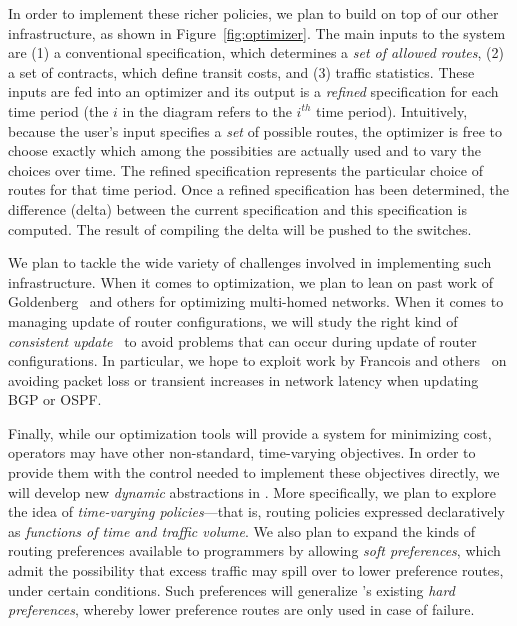 In order to implement these richer policies, we plan to build on top of our other infrastructure,
as shown in Figure~\ref{fig:optimizer}.  The main inputs to the system are (1) a conventional
\Name specification, which determines a \emph{set of allowed routes}, (2) a set of contracts, which
define transit costs, and (3) traffic statistics.  These inputs are fed into an optimizer and
its output is a \emph{refined} \Name specification
for each time period (the $i$ in the diagram refers to the $i^{th}$ time period).
Intuitively, because the user's input specifies a \emph{set} of possible routes, the optimizer is
free to choose exactly which among the possibities are actually used and to vary the choices over time.  
The refined specification represents the particular choice of routes for that time period.  
Once a refined specification has been determined, the difference (delta) between the current
specification and this specification is computed.  The result of compiling the delta will be
pushed to the switches.

We plan to tackle the wide variety of challenges involved in implementing such infrastructure.
When it comes to optimization, we plan to lean on past work 
of Goldenberg~\cite{Goldenberg:multi-home} and others for optimizing multi-homed networks.
When it comes to managing update of router configurations, we will study the right kind
of \emph{consistent update}~\cite{reitblatt+:consistent-updates,Katta:incremental-consistent,Jin:dynamic-updates,McClurg:update-synthesis,McClurg:event-driven-network-programming} to avoid problems that can
occur during update of router configurations.  In particular, we hope to exploit work by 
Francois and others~\cite{FCDB07,CMPFB13} on avoiding packet loss or transient increases 
in network latency when updating BGP or OSPF.  

Finally, while our optimization tools will provide a system for minimizing cost, operators may have 
other non-standard, time-varying objectives.  In order to provide them with the control needed to 
implement these objectives directly, we will develop new \emph{dynamic} abstractions in \Name.  
More specifically, we plan to explore the idea of \emph{time-varying policies}---that is, 
routing policies expressed declaratively as \emph{functions of time and traffic volume}.  We 
also plan to expand the kinds of routing preferences available to programmers 
by allowing \emph{soft preferences},
which admit the possibility that excess traffic may spill over to lower preference routes,
under certain conditions.  Such preferences will generalize \Propane's existing \emph{hard preferences}, whereby lower preference routes are only used in case of failure.

